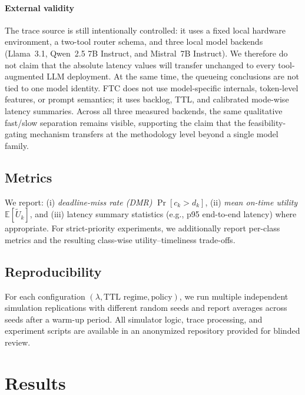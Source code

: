 \documentclass[preprint,12pt]{elsarticle}
\begin{document}
\paragraph{External validity}
The trace source is still intentionally controlled: it uses a fixed local hardware
environment, a two-tool router schema, and three local model backends
(Llama~3.1, Qwen~2.5 7B Instruct, and Mistral~7B Instruct).
We therefore do not claim that the absolute latency values will transfer unchanged to
every tool-augmented LLM deployment.
At the same time, the queueing conclusions are not tied to one model identity.
FTC does not use model-specific internals, token-level features, or prompt semantics;
it uses backlog, TTL, and calibrated mode-wise latency summaries.
Across all three measured backends, the same qualitative fast/slow separation remains
visible, supporting the claim that the feasibility-gating mechanism transfers at the
methodology level beyond a single model family.

\subsection{Metrics}
\label{sec:metrics}

We report:
(i) \emph{deadline-miss rate (DMR)} $\Pr[c_k>d_k]$,
(ii) \emph{mean on-time utility} $\mathbb{E}[\tilde{U}_k]$,
and (iii) latency summary statistics (e.g., p95 end-to-end latency) where appropriate.
For strict-priority experiments, we additionally report per-class metrics and the resulting class-wise utility--timeliness trade-offs.

\subsection{Reproducibility}
\label{sec:repro}

For each configuration $(\lambda,\text{TTL regime},\text{policy})$, we run multiple independent simulation replications with different random seeds and report averages across seeds after a warm-up period. All simulator logic, trace processing, and experiment scripts are available in an anonymized repository provided for blinded review.



\section{Results}
\label{sec:results}
\end{document}
